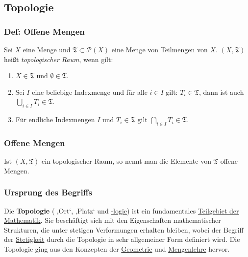 \documentclass[12pt,]{article}
\date{}
\providecommand{\tightlist}{%
  \setlength{\itemsep}{0pt}\setlength{\parskip}{0pt}}
\begin{document}
{
\hypersetup{linkcolor=black}
\setcounter{tocdepth}{3}
\tableofcontents
}
\subsection{Topologie}\label{topologie}

\subsubsection{Def: Offene Mengen}\label{def-offene-mengen}

Sei \(X\) eine Menge und
\(\mathfrak{T} \subset \mathcal{P}\left(X\right)\) eine Menge von
Teilmengen von \(X\). \((X,\mathfrak{T})\) heißt \emph{topologischer
Raum}, wenn gilt:

\begin{enumerate}
\tightlist
\item
  \(X \in \mathfrak{T}\) und \(\emptyset \in \mathfrak{T}\).
\item
  Sei \(I\) eine beliebige Indexmenge und für alle \(i \in I\) gilt:
  \(T_i \in \mathfrak{T}\), dann ist auch
  \(\displaystyle\bigcup_{i \in I} T_i \in \mathfrak{T}\).
\item
  Für endliche Indexmengen \(I\) und \(T_i \in \mathfrak{T}\) gilt
  \(\displaystyle\bigcap_{i \in I} T_i \in \mathfrak{T}\).
\end{enumerate}

\subsubsection{Offene Mengen}\label{offene-mengen}

Ist \((X,\mathfrak{T})\) ein topologischer Raum, so nennt man die
Elemente von \(\mathfrak{T}\) offene Mengen.

\subsubsection{Ursprung des Begriffs}\label{ursprung-des-begriffs}

Die \textbf{Topologie} ( \emph{} ‚Ort`, ‚Platz` und \url{-logie}) ist
ein fundamentales \href{Teilgebiete_der_Mathematik}{Teilgebiet der
Mathematik}. Sie beschäftigt sich mit den Eigenschaften mathematischer
Strukturen, die unter stetigen Verformungen erhalten bleiben, wobei der
Begriff der \href{Stetigkeit_(Topologie)}{Stetigkeit} durch die
Topologie in sehr allgemeiner Form definiert wird. Die Topologie ging
aus den Konzepten der \url{Geometrie} und \url{Mengenlehre} hervor.
\end{document}
